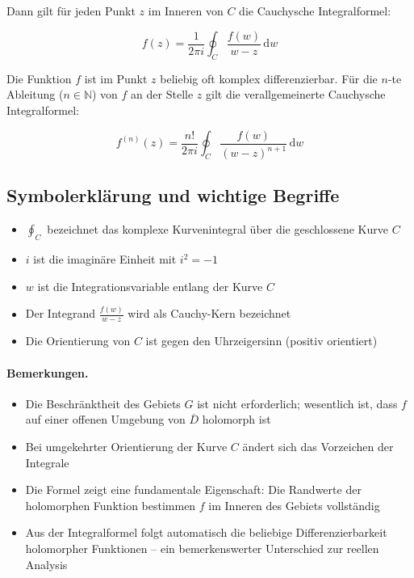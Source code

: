 \documentclass[a4paper,11pt,oneside,open=any,parskip=half, DIV=15]{scrreprt}
\begin{document}
   Dann gilt für jeden Punkt \( z \) im Inneren von \( C \) die Cauchysche Integralformel:
   \begin{importantbox}
      \[
         f(z) = \frac{1}{2\pi i} \oint_C \frac{f(w)}{w - z} \, \mathrm{d}w
      \]
   \end{importantbox}

   Die Funktion \( f \) ist im Punkt \( z \) beliebig oft komplex differenzierbar. 
   Für die \( n \)-te Ableitung (\( n \in \mathbb{N} \)) von \( f \) an der Stelle \( z \) 
   gilt die verallgemeinerte Cauchysche Integralformel:
   \begin{importantbox}
      \[
         f^{(n)}(z) = \frac{n!}{2\pi i} \oint_C \frac{f(w)}{(w - z)^{n+1}} \, \mathrm{d}w %
      \]
   \end{importantbox}

   \subsection*{Symbolerklärung und wichtige Begriffe}
   \begin{itemize}
      \item \( \oint_C \) bezeichnet das komplexe Kurvenintegral über die geschlossene Kurve \( C \)
      \item \( i \) ist die imaginäre Einheit mit \( i^2 = -1 \)
      \item \( w \) ist die Integrationsvariable entlang der Kurve \( C \)
      \item Der Integrand \( \frac{f(w)}{w - z} \) wird als Cauchy-Kern bezeichnet
      \item Die Orientierung von \( C \) ist gegen den Uhrzeigersinn (positiv orientiert)
   \end{itemize}

   \paragraph{Bemerkungen.}
      \begin{itemize}
      \item Die Beschränktheit des Gebiets \(G\) ist nicht erforderlich; wesentlich ist,
            dass \(f\) auf einer offenen Umgebung von \(\overline{D}\) holomorph ist
      \item Bei umgekehrter Orientierung der Kurve \(C\) ändert sich das Vorzeichen der Integrale
      \item Die Formel zeigt eine fundamentale Eigenschaft: Die Randwerte der holomorphen 
            Funktion bestimmen \(f\) im Inneren des Gebiets vollständig
      \item Aus der Integralformel folgt automatisch die beliebige Differenzierbarkeit 
            holomorpher Funktionen – ein bemerkenswerter Unterschied zur reellen Analysis
   \end{itemize}
\end{document}
